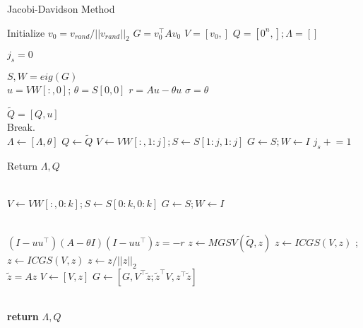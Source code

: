 \documentclass[a4paper]{article}
\begin{document}
\begin{algorithm}
\caption{Jacobi-Davidson Method}\label{alg:JDM}
\begin{algorithmic}[1]

\State Initialize $v_0 = v_{rand} / ||v_{rand}||_2$ 
\State $G = v_0^\top A v_0$ 
\State $V = [v_0,]$ 
\State $Q = [0^n,]; \Lambda = [] $

\State $j_s = 0$ 
\\


    \State $ S,W = eig(G)$
        \\
        \State $u = VW[:,0]$; $\theta = S[0,0]$
        \State $r = Au - \theta u$
        \State $\sigma = \theta $
        
        \State $\tilde{Q} = [Q,u]$
    \\
        \If{$(||r||_2 > \epsilon) \cup ( (dim(S)[0] <= 1) \cap (j_s \mathrel{!}= k - 1))$]} 
            \State Break.
        \EndIf
        \\
        \State $\Lambda \gets [\Lambda, \theta]$
        \State $Q \gets \tilde{Q}$
        \State $V \gets V W[:,1:j]; S \gets S[1:j,1:j]$
        \State $G \gets S ; W \gets I$
        \State $j_s \mathrel{+} = 1$

            \State Return $\Lambda, Q$ 
        \EndIf

    \EndWhile
    \\ 
        \State $V \gets VW[:, 0:k] ; S \gets S[0:k,0:k] $
        \State $G \gets S; W \gets I $
    \EndIf

    \\
    \State $(I-uu^\top) (A - \theta I ) (I -uu^\top) z = -r$ 
    \State $z \gets MGSV(\tilde{Q}, z)$ 
    \State $z \gets ICGS(V, z)$ ; $z \gets ICGS(V, z)$
    \State $z \gets z / ||z||_2$
    \\
    \State $\tilde{z} = Az$
    \State $V \gets [V,z]$ 
    \State $G \gets [G, V^\top \tilde{z} ; \tilde{z}^\top V, z^\top \tilde{z}]$ 

\EndFor

\\
\State \textbf{return} $\Lambda, Q$ 
\EndProcedure
\end{algorithmic}
\end{algorithm}
\end{document}
